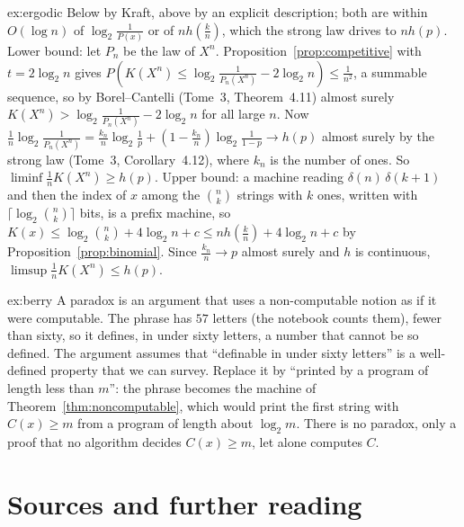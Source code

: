 \begin{solution}{ex:ergodic}
\idea Below by Kraft, above by an explicit description; both are within $O(\log n)$ of $\log_2\frac1{P(x)}$ or of $nh(\frac kn)$, which the strong law drives to $nh(p)$.
\writeup Lower bound: let $P_n$ be the law of $X^n$. Proposition~\ref{prop:competitive} with $t=2\log_2n$ gives $P(K(X^n)\le\log_2\frac1{P_n(X^n)}-2\log_2n)\le\frac1{n^2}$, a summable sequence, so by Borel--Cantelli (Tome~3, Theorem~4.11) almost surely $K(X^n)>\log_2\frac1{P_n(X^n)}-2\log_2n$ for all large $n$. Now $\frac1n\log_2\frac1{P_n(X^n)}=\frac{k_n}n\log_2\frac1p+(1-\frac{k_n}n)\log_2\frac1{1-p}\to h(p)$ almost surely by the strong law (Tome~3, Corollary~4.12), where $k_n$ is the number of ones. So $\liminf\frac1nK(X^n)\ge h(p)$. Upper bound: a machine reading $\delta(n)\,\delta(k+1)$ and then the index of $x$ among the $\binom nk$ strings with $k$ ones, written with $\lceil\log_2\binom nk\rceil$ bits, is a prefix machine, so $K(x)\le\log_2\binom nk+4\log_2n+c\le nh(\frac kn)+4\log_2n+c$ by Proposition~\ref{prop:binomial}. Since $\frac{k_n}n\to p$ almost surely and $h$ is continuous, $\limsup\frac1nK(X^n)\le h(p)$.
\end{solution}

\begin{solution}{ex:berry}
\idea A paradox is an argument that uses a non-computable notion as if it were computable.
\writeup The phrase has $57$ letters (the notebook counts them), fewer than sixty, so it defines, in under sixty letters, a number that cannot be so defined. The argument assumes that ``definable in under sixty letters'' is a well-defined property that we can survey. Replace it by ``printed by a program of length less than $m$'': the phrase becomes the machine of Theorem~\ref{thm:noncomputable}, which would print the first string with $C(x)\ge m$ from a program of length about $\log_2m$. There is no paradox, only a proof that no algorithm decides $C(x)\ge m$, let alone computes $C$.
\end{solution}

\section*{Sources and further reading}

